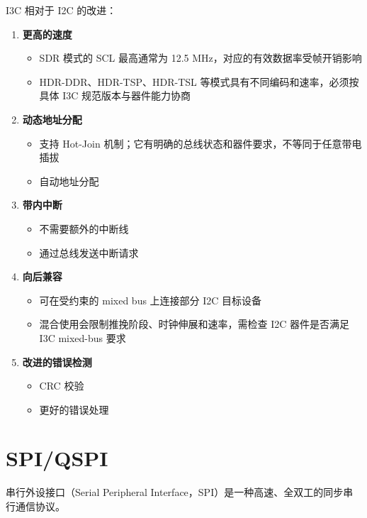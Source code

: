 I3C 相对于 I2C 的改进：

\begin{enumerate}
  \item \textbf{更高的速度}
    \begin{itemize}
      \item SDR 模式的 SCL 最高通常为 12.5 MHz，对应的有效数据率受帧开销影响
      \item HDR-DDR、HDR-TSP、HDR-TSL 等模式具有不同编码和速率，必须按具体 I3C 规范版本与器件能力协商
    \end{itemize}

  \item \textbf{动态地址分配}
    \begin{itemize}
      \item 支持 Hot-Join 机制；它有明确的总线状态和器件要求，不等同于任意带电插拔
      \item 自动地址分配
    \end{itemize}

  \item \textbf{带内中断}
    \begin{itemize}
      \item 不需要额外的中断线
      \item 通过总线发送中断请求
    \end{itemize}

  \item \textbf{向后兼容}
    \begin{itemize}
      \item 可在受约束的 mixed bus 上连接部分 I2C 目标设备
      \item 混合使用会限制推挽阶段、时钟伸展和速率，需检查 I2C 器件是否满足 I3C mixed-bus 要求
    \end{itemize}

  \item \textbf{改进的错误检测}
    \begin{itemize}
      \item CRC 校验
      \item 更好的错误处理
    \end{itemize}
\end{enumerate}

\section{SPI/QSPI}

串行外设接口（Serial Peripheral Interface，SPI）是一种高速、全双工的同步串行通信协议。

